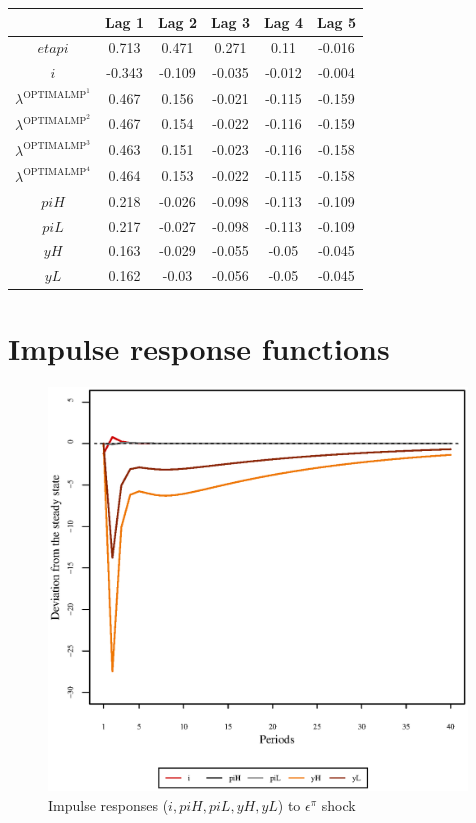 \begin{tabular}{c|ccccc|}
  & Lag 1 & Lag 2 & Lag 3 & Lag 4 & Lag 5\\
\hline
${e\!t\!a\!p\!i}$ & 0.713 & 0.471 & 0.271 & 0.11 & -0.016 \\
$i$ & -0.343 & -0.109 & -0.035 & -0.012 & -0.004 \\
$\lambda^{\mathrm{OPTIMALMP}^{\mathrm{1}}}$ & 0.467 & 0.156 & -0.021 & -0.115 & -0.159 \\
$\lambda^{\mathrm{OPTIMALMP}^{\mathrm{2}}}$ & 0.467 & 0.154 & -0.022 & -0.116 & -0.159 \\
$\lambda^{\mathrm{OPTIMALMP}^{\mathrm{3}}}$ & 0.463 & 0.151 & -0.023 & -0.116 & -0.158 \\
$\lambda^{\mathrm{OPTIMALMP}^{\mathrm{4}}}$ & 0.464 & 0.153 & -0.022 & -0.115 & -0.158 \\
${p\!i\!H}$ & 0.218 & -0.026 & -0.098 & -0.113 & -0.109 \\
${p\!i\!L}$ & 0.217 & -0.027 & -0.098 & -0.113 & -0.109 \\
${y\!H}$ & 0.163 & -0.029 & -0.055 & -0.05 & -0.045 \\
${y\!L}$ & 0.162 & -0.03 & -0.056 & -0.05 & -0.045 \\
\hline
\end{tabular}



\pagebreak

\section{Impulse response functions}

\begin{figure}[h]
\centering
\begin{minipage}{0.5\textwidth}
\vspace*{-3em}
\centering
\includegraphics[width=0.99\textwidth, scale=0.55]{plots/plot_50.eps}
\caption{Impulse responses ($i, {p\!i\!H}, {p\!i\!L}, {y\!H}, {y\!L}$) to $\epsilon^{\pi}$ shock}
\end{minipage}
\end{figure}
